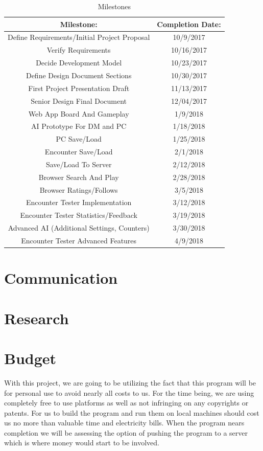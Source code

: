 \documentclass[12pt,a4paper]{report}
\begin{document}
	\begin{table}[H]
		\begin{center}
			\begin{tabular}{ |c|c| } 
				\hline
				Milestone: & Completion Date: \\
				\hline
				Define Requirements/Initial Project Proposal & 10/9/2017 \\
				Verify Requirements & 10/16/2017 \\
				Decide Development Model & 10/23/2017 \\
				Define Design Document Sections & 10/30/2017 \\
				First Project Presentation Draft & 11/13/2017 \\
				Senior Design Final Document & 12/04/2017 \\
				Web App Board And Gameplay & 1/9/2018 \\
				AI Prototype For DM and PC & 1/18/2018 \\ 
				PC Save/Load & 1/25/2018 \\
				Encounter Save/Load & 2/1/2018 \\
				Save/Load To Server & 2/12/2018 \\
				Browser Search And Play & 2/28/2018 \\
				Browser Ratings/Follows & 3/5/2018 \\
				Encounter Tester Implementation & 3/12/2018 \\
				Encounter Tester Statistics/Feedback & 3/19/2018 \\
				Advanced AI (Additional Settings, Counters) & 3/30/2018 \\
				Encounter Tester Advanced Features & 4/9/2018 \\	
				\hline
			\end{tabular}
		\end{center}
		\caption{Milestones} \label{table: milestones}
	\end{table}
	
	\section{Communication}
	\section{Research}
	\section{Budget}
	With this project, we are going to be utilizing the fact that this program will be for personal use to avoid nearly all costs to us. For the time being, we are using completely free to use platforms as well as not infringing on any copyrights or patents. For us to build the program and run them on local machines should cost us no more than valuable time and electricity bills. When the program nears completion we will be assessing the option of pushing the program to a server which is where money would start to be involved.
\end{document}
